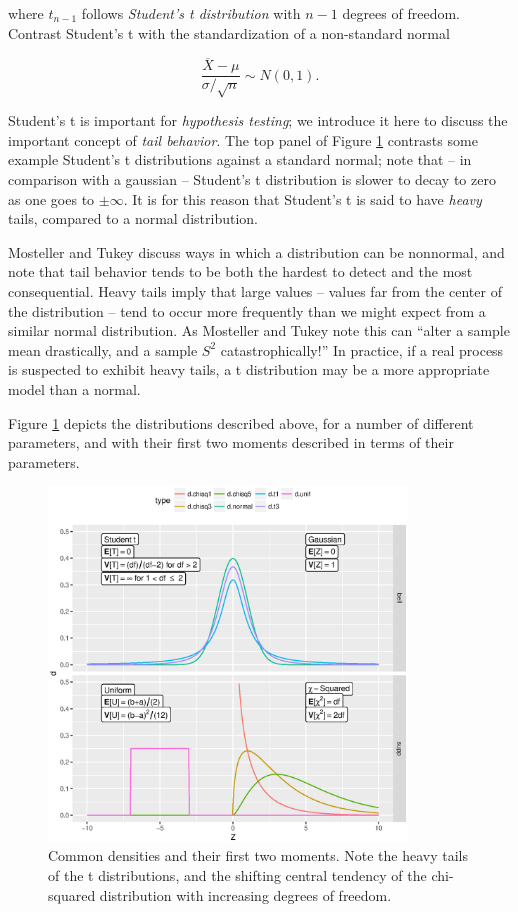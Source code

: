 \documentclass[../primer.tex]{subfiles}
\begin{document}
\noindent where $t_{n-1}$ follows \emph{Student's t distribution} with $n-1$
degrees of freedom. Contrast Student's t with the standardization of a
non-standard normal

\begin{equation}
  \frac{\overline{X} - \mu}{\sigma/\sqrt{n}} \sim N(0, 1).
\end{equation}

Student's t is important for \emph{hypothesis testing}; we introduce it here to
discuss the important concept of \emph{tail behavior}. The top panel of Figure
\ref{fig:dist-sheet} contrasts some example Student's t distributions against a
standard normal; note that -- in comparison with a gaussian -- Student's t
distribution is slower to decay to zero as one goes to $\pm\infty$. It is for
this reason that Student's t is said to have \emph{heavy} tails, compared to a
normal distribution.

Mosteller and Tukey\cite{mosteller1977data} discuss ways in which a distribution
can be nonnormal, and note that tail behavior tends to be both the hardest to
detect and the most consequential. Heavy tails imply that large values -- values
far from the center of the distribution -- tend to occur more frequently than we
might expect from a similar normal distribution. As Mosteller and Tukey note
this can ``alter a sample mean drastically, and a sample $S^2$
catastrophically!'' In practice, if a real process is suspected to exhibit heavy
tails, a t distribution may be a more appropriate model than a normal.

Figure \ref{fig:dist-sheet} depicts the distributions described above, for a
number of different parameters, and with their first two moments described in
terms of their parameters.

\begin{figure}[!ht]
  \centering
  \includegraphics[width=0.85\textwidth]{./images/dist_sheet}

  \caption{Common densities and their first two moments. Note the heavy tails of
    the t distributions, and the shifting central tendency of the chi-squared
    distribution with increasing degrees of freedom.}
  \label{fig:dist-sheet}
\end{figure}
\end{document}
